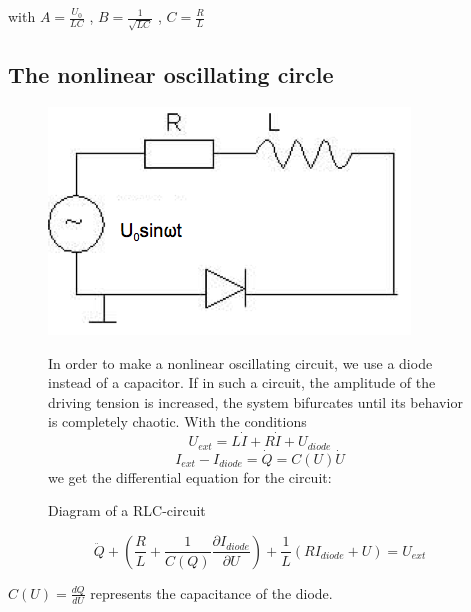 with  $A=\frac{U_0}{LC}$ ,  $B=\frac{1}{\sqrt{LC}}$ ,  $C=\frac{R}{L}$

\subsection{The nonlinear oscillating circle}
\begin{figure}[H]
\begin{minipage}{0.5\textwidth}
\includegraphics[width=\textwidth]{Bilder/nlcirc.png}
\caption{Diagram of a RLC-circuit}
\end{minipage}
\begin{minipage}{0.5\textwidth}
In order to make a nonlinear oscillating circuit, we use a diode instead of a capacitor. If in such a circuit, the amplitude of the driving tension is increased, the system bifurcates until its behavior is completely chaotic. With the conditions
$$U_{ext} = L\dot I + R\dot I + U_{diode}$$
$$I_{ext}-I_{diode} = \dot Q = C(U)\dot U$$
we get the differential equation for the circuit:
\end{minipage}
\end{figure}

\begin{equation} 
\ddot Q + \left(\frac{R}{L} + \frac{1}{C(Q)} \frac{\partial I_{diode}}{\partial U}\right) + \frac{1}{L}(RI_{diode}+U)=U_{ext} \end{equation}

$C(U) = \frac{dQ}{dU}$ represents the capacitance of the diode.

